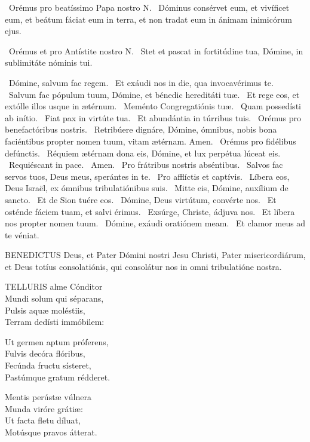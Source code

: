 \V\ Orémus pro beatíssimo Papa nostro N. \R\ Dóminus consérvet eum, et vivíficet eum, et beátum fáciat eum in terra, et non tradat eum in ánimam inimicórum ejus.

\V\ Orémus et pro Antístite nostro N. \R\ Stet et pascat in fortitúdine tua, Dómine, in sublimitáte nóminis tui.

\V\ Dómine, salvum fac regem. \R\ Et exáudi nos in die, qua invocavérimus te. \V\ Salvum fac pópulum tuum, Dómine, et bénedic hereditáti tuæ. \R\ Et rege eos, et extólle illos usque in ætérnum. \V\ Meménto Congregatiónis tuæ. \R\ Quam possedísti ab inítio. \V\ Fiat pax in virtúte tua. \R\ Et abundántia in túrribus tuis. \V\ Orémus pro benefactóribus nostris. \R\ Retribúere dignáre, Dómine, ómnibus, nobis bona faciéntibus propter nomen tuum, vitam ætérnam. Amen. \V\ Orémus pro fidélibus defúnctis. \R\ Réquiem ætérnam dona eis, Dómine, et lux perpétua lúceat eis. \V\ Requiéscant in pace. \R\ Amen. \V\ Pro frátribus nostris abséntibus. \R\ Salvos fac servos tuos, Deus meus, sperántes in te. \V\ Pro afflíctis et captívis. \R\ Líbera eos, Deus Israël, ex ómnibus tribulatiónibus suis. \V\ Mitte eis, Dómine, auxílium de sancto. \R\ Et de Sion tuére eos. \V\ Dómine, Deus virtútum, convérte nos. \R\ Et osténde fáciem tuam, et salvi érimus. \V\ Exsúrge, Christe, ádjuva nos. \R\ Et líbera nos propter nomen tuum. \V\ Dómine, exáudi oratiónem meam. \R\ Et clamor meus ad te véniat.




\lettrine[lines=2]{B}{ENEDICTUS} Deus, et Pater Dómini nostri Jesu Christi, Pater misericordiárum, et Deus totíus consolatiónis, qui consolátur nos in omni tribulatióne nostra.


\lettrine[lines=2]{T}{ELLURIS} alme Cónditor\\
Mundi solum qui séparans,\\
Pulsis aquæ moléstiis,\\
Terram dedísti immóbilem:

Ut germen aptum próferens,\\
Fulvis decóra flóribus,\\
Fecúnda fructu sísteret,\\
Pastúmque gratum rédderet.

Mentis perústæ vúlnera\\
Munda viróre grátiæ:\\
Ut facta fletu díluat,\\
Motúsque pravos átterat.

